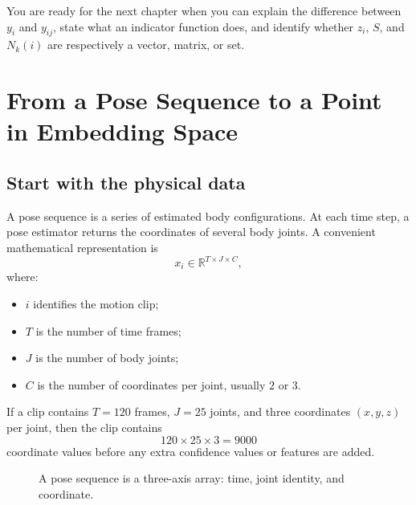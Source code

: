 \documentclass[11pt,oneside,openany]{book}
\theoremstyle{myplain}
\theoremstyle{definition}
\newcommand{\R}{\mathbb{R}}
\begin{document}
\begin{meetingbox}[title=Checkpoint before continuing]
You are ready for the next chapter when you can explain the difference between $y_i$ and $y_{ij}$, state what an indicator function does, and identify whether $z_i$, $S$, and $N_k(i)$ are respectively a vector, matrix, or set.
\end{meetingbox}

\chapter{From a Pose Sequence to a Point in Embedding Space}
\label{chap:pose-to-vector}

\section{Start with the physical data}

A pose sequence is a series of estimated body configurations. At each time step, a pose estimator returns the coordinates of several body joints. A convenient mathematical representation is
\[
  x_i\in\R^{T\times J\times C},
\]
where:
\begin{itemize}[leftmargin=*]
  \item $i$ identifies the motion clip;
  \item $T$ is the number of time frames;
  \item $J$ is the number of body joints;
  \item $C$ is the number of coordinates per joint, usually $2$ or $3$.
\end{itemize}

If a clip contains $T=120$ frames, $J=25$ joints, and three coordinates $(x,y,z)$ per joint, then the clip contains
\[
120\times25\times3=9000
\]
coordinate values before any extra confidence values or features are added.

\begin{figure}[H]
\centering
{}
\caption{A pose sequence is a three-axis array: time, joint identity, and coordinate.}
\end{figure}
\end{document}
